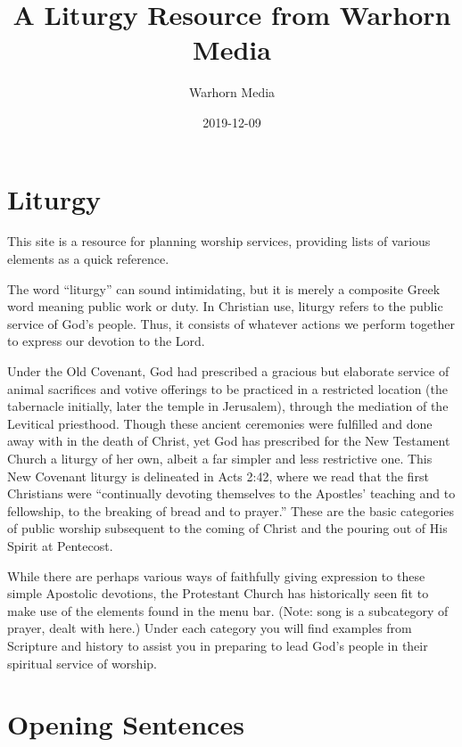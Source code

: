 \documentclass[]{book}
\title{A Liturgy Resource from Warhorn Media}
\author{Warhorn Media}
\date{2019-12-09}
\begin{document}
\maketitle

{
\setcounter{tocdepth}{1}
\tableofcontents
}
\hypertarget{liturgy}{%
\chapter*{Liturgy}\label{liturgy}}

This site is a resource for planning worship services, providing lists of various elements as a quick reference.

The word ``liturgy'' can sound intimidating, but it is merely a composite Greek word meaning public work or duty. In Christian use, liturgy refers to the public service of God's people. Thus, it consists of whatever actions we perform together to express our devotion to the Lord.

Under the Old Covenant, God had prescribed a gracious but elaborate service of animal sacrifices and votive offerings to be practiced in a restricted location (the tabernacle initially, later the temple in Jerusalem), through the mediation of the Levitical priesthood. Though these ancient ceremonies were fulfilled and done away with in the death of Christ, yet God has prescribed for the New Testament Church a liturgy of her own, albeit a far simpler and less restrictive one. This New Covenant liturgy is delineated in Acts 2:42, where we read that the first Christians were ``continually devoting themselves to the Apostles' teaching and to fellowship, to the breaking of bread and to prayer.'' These are the basic categories of public worship subsequent to the coming of Christ and the pouring out of His Spirit at Pentecost.

While there are perhaps various ways of faithfully giving expression to these simple Apostolic devotions, the Protestant Church has historically seen fit to make use of the elements found in the menu bar. (Note: song is a subcategory of prayer, dealt with here.) Under each category you will find examples from Scripture and history to assist you in preparing to lead God's people in their spiritual service of worship.

\hypertarget{opening-sentences}{%
\chapter*{Opening Sentences}\label{opening-sentences}}
\end{document}
